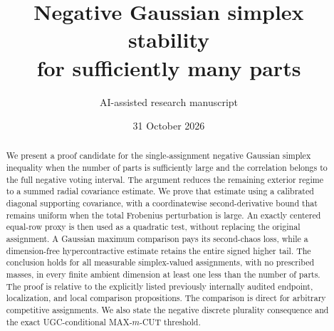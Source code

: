 \documentclass[11pt]{article}
\title{\bfseries Negative Gaussian simplex stability\\for sufficiently many parts}
\author{AI-assisted research manuscript}
\date{31 October 2026}
\numberwithin{equation}{section}
\theoremstyle{remark}
\begin{document}
\maketitle
\begin{center}
\end{center}
\begin{abstract}
We present a proof candidate for the single-assignment negative Gaussian
simplex inequality when the number of parts is sufficiently large and the
correlation belongs to the full negative voting interval. The argument
reduces the remaining exterior regime to a summed radial covariance
estimate. We prove that estimate using a calibrated diagonal supporting
covariance, with a coordinatewise second-derivative bound that remains
uniform when the total Frobenius perturbation is large. An exactly centered
equal-row proxy is then used as a quadratic test, without replacing the
original assignment. A Gaussian maximum comparison pays its second-chaos
loss, while a dimension-free hypercontractive estimate retains the entire
signed higher tail. The conclusion holds for all measurable simplex-valued
assignments, with no prescribed masses, in every finite ambient dimension
at least one less than the number of parts. The proof is relative to the
explicitly listed previously internally audited endpoint, localization,
and local comparison propositions. The comparison is direct for arbitrary
competitive assignments. We also state the negative discrete plurality
consequence and the exact UGC-conditional MAX-$m$-CUT threshold.
\end{abstract}
\setcounter{tocdepth}{1}
\tableofcontents
\clearpage





\appendix

\end{document}
